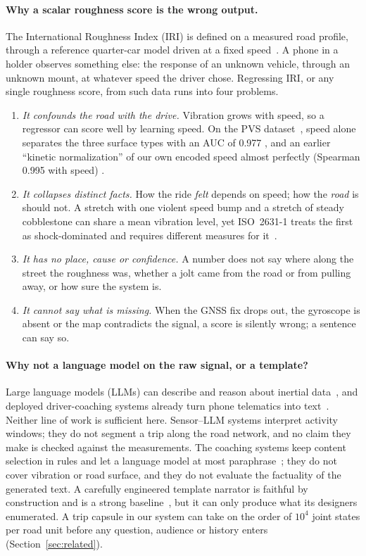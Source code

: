 \paragraph{Why a scalar roughness score is the wrong output.}
The International Roughness Index (IRI) is defined on a measured road profile, through a reference quarter-car model driven at a fixed speed~\cite{sayers1986iri}.
A phone in a holder observes something else: the response of an unknown vehicle, through an unknown mount, at whatever speed the driver chose.
Regressing IRI, or any single roughness score, from such data runs into four problems.
\begin{enumerate}
\item \emph{It confounds the road with the drive.} Vibration grows with speed, so a regressor can score well by learning speed. On the PVS dataset~\cite{menegazzo2021pvs}, speed alone separates the three surface types with an AUC of 0.977 , and an earlier ``kinetic normalization'' of our own encoded speed almost perfectly (Spearman 0.995 with speed) .
\item \emph{It collapses distinct facts.} How the ride \emph{felt} depends on speed; how the \emph{road} is should not. A stretch with one violent speed bump and a stretch of steady cobblestone can share a mean vibration level, yet ISO~2631-1 treats the first as shock-dominated and requires different measures for it~\cite{iso2631}.
\item \emph{It has no place, cause or confidence.} A number does not say where along the street the roughness was, whether a jolt came from the road or from pulling away, or how sure the system is.
\item \emph{It cannot say what is missing.} When the GNSS fix drops out, the gyroscope is absent or the map contradicts the signal, a score is silently wrong; a sentence can say so.
\end{enumerate}

\paragraph{Why not a language model on the raw signal, or a template?}
Large language models (LLMs) can describe and reason about inertial data~\cite{xu2024penetrative,li2025sensorllm,imran2024llasa,yoon2024bymyeyes}, and deployed driver-coaching systems already turn phone telematics into text~\cite{braun2018saferdrive,baig2022drivingbeacon,thompson2026localising}.
Neither line of work is sufficient here.
Sensor--LLM systems interpret activity windows; they do not segment a trip along the road network, and no claim they make is checked against the measurements.
The coaching systems keep content selection in rules and let a language model at most paraphrase~\cite{thompson2026localising}; they do not cover vibration or road surface, and they do not evaluate the factuality of the generated text.
A carefully engineered template narrator is faithful by construction and is a strong baseline~\cite{vandeemter2005templates}, but it can only produce what its designers enumerated.
A trip capsule in our system can take on the order of $10^4$ joint states per road unit before any question, audience or history enters (Section~\ref{sec:related}).

